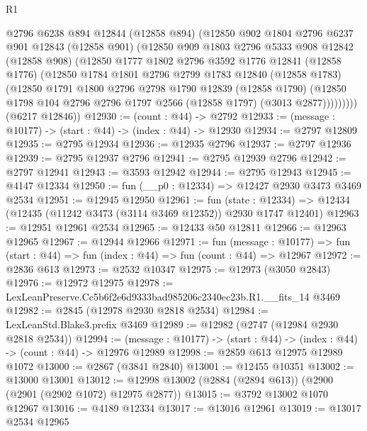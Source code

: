 \begin{lexlean}{R1}
\begin{coremodule}
          @2796
          @6238
          @894
          @12844
          (@12858 @894)
          (@12850
            @902
            @1804
            @2796
            @6237
            @901
            @12843
            (@12858 @901)
            (@12850
              @909
              @1803
              @2796
              @5333
              @908
              @12842
              (@12858 @908)
              (@12850
                @1777
                @1802
                @2796
                @3592
                @1776
                @12841
                (@12858 @1776)
                (@12850
                  @1784
                  @1801
                  @2796
                  @2799
                  @1783
                  @12840
                  (@12858 @1783)
                  (@12850
                    @1791
                    @1800
                    @2796
                    @2798
                    @1790
                    @12839
                    (@12858 @1790)
                    (@12850 @1798 @104 @2796 @2796 @1797 @2566 (@12858 @1797) (@3013 @2877)))))))))
      (@6217 @12846))
@12930 := (count : @44) -> @2792
@12933 := (message : @10177) -> (start : @44) -> (index : @44) -> @12930
@12934 := @2797 @12809
@12935 := @2795 @12934
@12936 := @12935 @2796
@12937 := @2797 @12936
@12939 := @2795 @12937 @2796
@12941 := @2795 @12939 @2796
@12942 := @2797 @12941
@12943 := @3593 @12942
@12944 := @2795 @12943
@12945 := @4147 @12334
@12950 := fun (__p0 : @12334) => @12427 @2930 @3473 @3469 @2534
@12951 := @12945 @12950
@12961 := fun (state : @12334) =>
  @12434 (@12435 (@11242 @3473 (@3114 @3469 @12352)) @2930 @1747 @12401)
@12963 := @12951 @12961 @2534
@12965 := @12433 @50 @12811
@12966 := @12963 @12965
@12967 := @12944 @12966
@12971 := fun (message : @10177) =>
  fun (start : @44) => fun (index : @44) => fun (count : @44) => @12967
@12972 := @2836 @613
@12973 := @2532 @10347
@12975 := @12973 (@3050 @2843)
@12976 := @12972 @12975
@12978 := LexLeanPreserve.Cc5b6f2e6d9333bad985206c2340ec23b.R1.__fits_14 @3469
@12982 := @2845 (@12978 @2930 @2818 @2534)
@12984 := LexLeanStd.Blake3.prefix @3469
@12989 := @12982 (@2747 (@12984 @2930 @2818 @2534))
@12994 := (message : @10177) -> (start : @44) -> (index : @44) -> (count : @44) -> @12976 @12989
@12998 := @2859 @613 @12975 @12989 @1072
@13000 := @2867 (@3841 @2840)
@13001 := @12455 @10351
@13002 := @13000 @13001
@13012 := @12998 @13002 (@2884 (@2894 @613)) (@2900 (@2901 (@2902 @1072) @12975 @2877))
@13015 := @3792 @13002 @1070 @12967
@13016 := @4189 @12334
@13017 := @13016 @12961
@13019 := @13017 @2534 @12965

\end{coremodule}
\end{lexlean}
